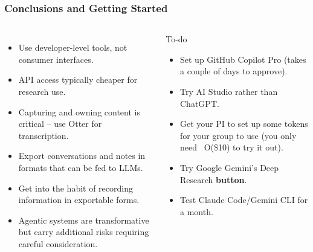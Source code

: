 \documentclass[aspectratio=169]{beamer}
\begin{document}
\begin{frame}
    \frametitle{Conclusions and Getting Started}
    
    \begin{columns}
        \begin{itemize}
            \item Use developer-level tools, not consumer interfaces.
            \item API access typically cheaper for research use.
            \item Capturing and owning content is critical -- use Otter for transcription.
            \item Export conversations and notes in formats that can be fed to LLMs.
            \item Get into the habit of recording information in exportable forms.
            \item Agentic systems are transformative but carry additional risks requiring careful consideration.
        \end{itemize}
        
        \begin{block}{To-do}
            \begin{itemize}
                \item Set up GitHub Copilot Pro (takes a couple of days to approve).
                \item Try AI Studio rather than ChatGPT.
                \item Get your PI to set up some tokens for your group to use (you only need ~O(\$10) to try it out).
                \item Try Google Gemini's Deep Research \textbf{button}.
                \item Test Claude Code/Gemini CLI for a month.
            \end{itemize}
        \end{block}
    \end{columns}
\end{frame}
\end{document}
